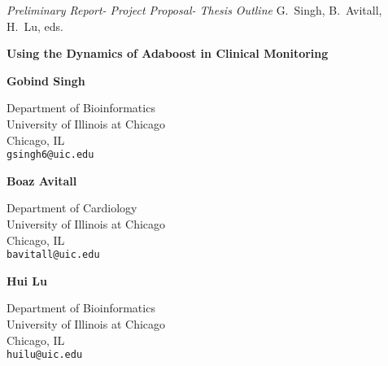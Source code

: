 \documentclass[12pt]{article}
\begin{document}
\noindent
\footnotesize{
\noindent
\textit{Preliminary Report- Project Proposal- Thesis Outline}
\noindent
G.~Singh, B.~Avitall, H.~Lu, eds.}

\vspace{0.1in}
\begin{center}
    {\large\bf Using the Dynamics of Adaboost in Clinical Monitoring}\\
    \vspace{0.3in}
\end{center}

\begin{multicols}{3}
\begin{center}
\textbf{Gobind Singh}

Department of Bioinformatics\\
University of Illinois at Chicago\\
Chicago, IL\\
\texttt{gsingh6@uic.edu}\\
\columnbreak

\textbf{Boaz Avitall}

Department of Cardiology\\
University of Illinois at Chicago\\
Chicago, IL\\
\texttt{bavitall@uic.edu}
\columnbreak

\textbf{Hui Lu}

Department of Bioinformatics\\
University of Illinois at Chicago\\
Chicago, IL\\
\texttt{huilu@uic.edu}\\

\end{center}
\end{multicols}
\end{document}
